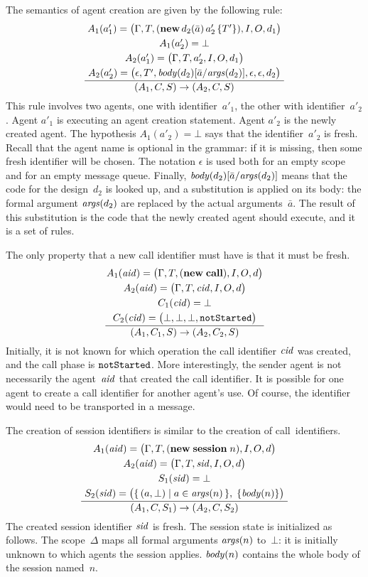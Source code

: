 \documentclass[a4paper,12pt,oneside,fleqn]{book} %
\newcommand{\on}[2]{\genfrac{}{}{0pt}{0}{\strut#1}{\strut#2}}
\begin{document}
{The semantics of agent creation are given by the following rule:
\begin{align}
\frac
  {\on{A_1(a'_1)=\bigl(\Gamma,T,({\bf new}\,d_2(\bar{a})\,a'_2\,\{T'\}),I,O,d_1\bigr)}
  {\on{A_1(a'_2)=\bot}
  {\on{A_2(a'_1)=\bigl(\Gamma,T,a'_2,I,O,d_1\bigr)}
  {A_2(a'_2)=\bigl(\epsilon,T',{\it body}(d_2)[\bar{a}/{\it
  args}(d_2)],\epsilon,\epsilon, d_2\bigr)}}}}
  {(A_1,C,S)\to(A_2,C,S)}
\label{eq:opsem-newagent}
\end{align}
This rule involves two agents, one with identifier~$a'_1$, the other with
identifier~$a'_2$. Agent $a'_1$ is executing an agent creation statement.
Agent $a'_2$ is the newly created agent. The hypothesis $A_1(a'_2)=\bot$
says that the identifier~$a'_2$ is fresh. Recall that the agent name is
optional in the grammar: if it is missing, then some fresh identifier will
be chosen.  The notation $\epsilon$ is used both for an empty scope and for
an empty message queue. Finally, ${\it body}(d_2)[\bar{a}/{\it args}(d_2)]$
means that the code for the design~$d_2$ is looked up, and a substitution is
applied on its body: the formal argument ${\it args}(d_2)$ are replaced by
the actual arguments~$\bar a$. The result of this substitution is the code
that the newly created agent should execute, and it is a set of rules.

The only property that a new call identifier must have is that it must be
fresh.
\begin{align}
\frac
  {\on{A_1({\it aid})=\bigl(\Gamma,T,({\bf new}\;{\bf call}),I,O,d\bigr)}
  {\on{A_2({\it aid})=\bigl(\Gamma,T,{\it cid},I,O,d\bigr)}
  {\on{C_1({\it cid})=\bot}
      {C_2({\it cid})=\bigl(\bot,\bot,\bot,{\tt notStarted}\bigr)}}}}
  {(A_1,C_1,S)\to(A_2,C_2,S)}
\end{align}
Initially, it is not known for which operation the call identifier $\it
cid$ was created, and the call phase is $\tt notStarted$. More
interestingly, the sender agent is not necessarily the agent~$\it aid$ that
created the call identifier. It is possible for one agent to create a call
identifier for another agent's use. Of course, the identifier would need
to be transported in a message.

The creation of session identifiers is similar to the creation of
call~identifiers.
\begin{align}
\frac
  {\on{A_1({\it aid})=\bigl(\Gamma,T,({\bf new}\;{\bf session}\;n),I,O,d\bigr)}
  {\on{A_2({\it aid})=\bigl(\Gamma,T,{\it sid},I,O,d\bigr)}
  {\on{S_1({\it sid})=\bot}
      {S_2({\it sid})=\bigl(\{\,(a,\bot)\mid a\in{\it args}(n)\,\},\;
        \{{\it body}(n)\}\bigr)}}}}
  {(A_1,C,S_1)\to(A_2,C,S_2)}
\end{align}
The created session identifier $\it sid$ is fresh. The session state is
initialized as follows. The scope~$\Delta$ maps all formal arguments ${\it
args}(n)$ to~$\bot$: it is initially unknown to which agents the session
applies. ${\it body}(n)$ contains the whole body of the session named~$n$.

}
\end{document}
